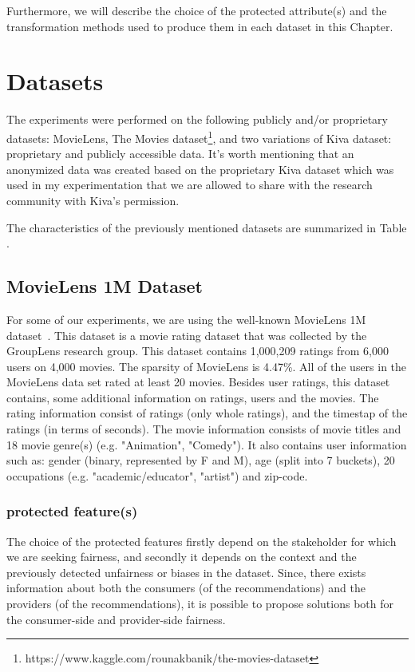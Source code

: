 Furthermore, we will describe the choice of the protected attribute(s) and the transformation methods used to produce them in each dataset in this Chapter.


\section{Datasets}

The experiments were performed on the following publicly and/or proprietary datasets: MovieLens\cite{movielens}, The Movies dataset\footnote{https://www.kaggle.com/rounakbanik/the-movies-dataset}, and two variations of Kiva dataset: proprietary and publicly accessible data.
It's worth mentioning that an anonymized data was created based on the proprietary Kiva dataset which was used in my experimentation that we are allowed to share with the research community with Kiva's permission.



The characteristics of the previously mentioned datasets are summarized in Table .  

    \subsection{MovieLens 1M Dataset}
    For some of our experiments, we are using the well-known MovieLens 1M dataset~\cite{movielens}. This dataset is a movie rating dataset that was collected by the GroupLens research group. This dataset contains 1,000,209 ratings from 6,000 users on 4,000 movies. The sparsity of MovieLens is 4.47\%. All of the users in the MovieLens data set rated at least 20 movies.
    Besides user ratings, this dataset contains, some additional information on ratings, users and the movies. The rating information consist of ratings (only whole ratings), and the timestap of the ratings (in terms of seconds). The movie information consists of movie titles and 18 movie genre(s) (e.g. "Animation", "Comedy"). It also contains user information such as: gender (binary, represented by F and M), age (split into 7 buckets), 20 occupations (e.g. "academic/educator", "artist") and zip-code.
    
        \subsubsection{protected feature(s)}
        The choice of the protected features firstly depend on the stakeholder for which we are seeking fairness, and secondly it depends on the context and the previously detected unfairness or biases in the dataset. Since, there exists information about both the consumers (of the recommendations) and the providers (of the recommendations), it is possible to propose solutions both for the consumer-side and provider-side fairness.
        
